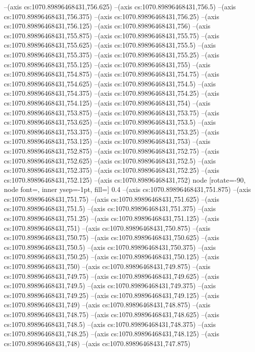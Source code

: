 --(axis cs:1070.89896468431,756.625)
--(axis cs:1070.89896468431,756.5)
--(axis cs:1070.89896468431,756.375)
--(axis cs:1070.89896468431,756.25)
--(axis cs:1070.89896468431,756.125)
--(axis cs:1070.89896468431,756)
--(axis cs:1070.89896468431,755.875)
--(axis cs:1070.89896468431,755.75)
--(axis cs:1070.89896468431,755.625)
--(axis cs:1070.89896468431,755.5)
--(axis cs:1070.89896468431,755.375)
--(axis cs:1070.89896468431,755.25)
--(axis cs:1070.89896468431,755.125)
--(axis cs:1070.89896468431,755)
--(axis cs:1070.89896468431,754.875)
--(axis cs:1070.89896468431,754.75)
--(axis cs:1070.89896468431,754.625)
--(axis cs:1070.89896468431,754.5)
--(axis cs:1070.89896468431,754.375)
--(axis cs:1070.89896468431,754.25)
--(axis cs:1070.89896468431,754.125)
--(axis cs:1070.89896468431,754)
--(axis cs:1070.89896468431,753.875)
--(axis cs:1070.89896468431,753.75)
--(axis cs:1070.89896468431,753.625)
--(axis cs:1070.89896468431,753.5)
--(axis cs:1070.89896468431,753.375)
--(axis cs:1070.89896468431,753.25)
--(axis cs:1070.89896468431,753.125)
--(axis cs:1070.89896468431,753)
--(axis cs:1070.89896468431,752.875)
--(axis cs:1070.89896468431,752.75)
--(axis cs:1070.89896468431,752.625)
--(axis cs:1070.89896468431,752.5)
--(axis cs:1070.89896468431,752.375)
--(axis cs:1070.89896468431,752.25)
--(axis cs:1070.89896468431,752.125)
--(axis cs:1070.89896468431,752)
node [rotate=-90, node font=\tiny, inner ysep=-1pt, fill=\bgcol] {0.4}
--(axis cs:1070.89896468431,751.875)
--(axis cs:1070.89896468431,751.75)
--(axis cs:1070.89896468431,751.625)
--(axis cs:1070.89896468431,751.5)
--(axis cs:1070.89896468431,751.375)
--(axis cs:1070.89896468431,751.25)
--(axis cs:1070.89896468431,751.125)
--(axis cs:1070.89896468431,751)
--(axis cs:1070.89896468431,750.875)
--(axis cs:1070.89896468431,750.75)
--(axis cs:1070.89896468431,750.625)
--(axis cs:1070.89896468431,750.5)
--(axis cs:1070.89896468431,750.375)
--(axis cs:1070.89896468431,750.25)
--(axis cs:1070.89896468431,750.125)
--(axis cs:1070.89896468431,750)
--(axis cs:1070.89896468431,749.875)
--(axis cs:1070.89896468431,749.75)
--(axis cs:1070.89896468431,749.625)
--(axis cs:1070.89896468431,749.5)
--(axis cs:1070.89896468431,749.375)
--(axis cs:1070.89896468431,749.25)
--(axis cs:1070.89896468431,749.125)
--(axis cs:1070.89896468431,749)
--(axis cs:1070.89896468431,748.875)
--(axis cs:1070.89896468431,748.75)
--(axis cs:1070.89896468431,748.625)
--(axis cs:1070.89896468431,748.5)
--(axis cs:1070.89896468431,748.375)
--(axis cs:1070.89896468431,748.25)
--(axis cs:1070.89896468431,748.125)
--(axis cs:1070.89896468431,748)
--(axis cs:1070.89896468431,747.875)
